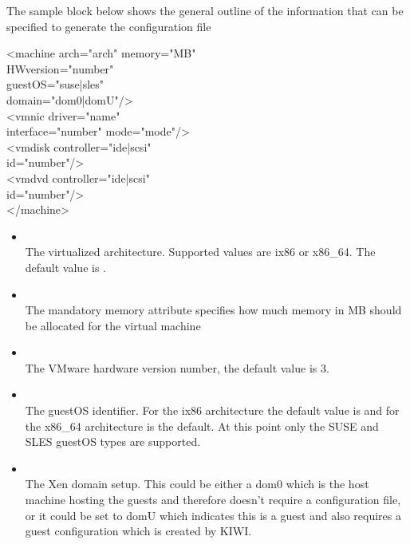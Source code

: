 \begin{itemize}
    The sample block below shows the general outline of the information
    that can be specified to generate the configuration file

	\begin{Command}{12cm}
	<machine arch="arch" memory="MB"\\
	\hspace*{2.5cm}HWversion="number"\\
	\hspace*{2.5cm}guestOS="suse|sles"\\
	\hspace*{2.5cm}domain="dom0|domU"/>\\
	\hspace*{1cm}<vmnic driver="name"\\
	\hspace*{2.5cm}interface="number" mode="mode"/>\\
	\hspace*{1cm}<vmdisk controller="ide|scsi"\\
	\hspace*{2.5cm}id="number"/>\\
	\hspace*{1cm}<vmdvd controller="ide|scsi"\\
	\hspace*{2.5cm}id="number"/>\\
	</machine>
	\end{Command}

	\begin{itemize}
	\item {}\\
      The virtualized architecture. Supported values are ix86 or x86\_64.
      The default value is .
	\item {}\\
      The mandatory memory attribute specifies how much memory in MB
      should be allocated for the virtual machine
	\item {}\\
      The VMware hardware version number, the default value is 3.
	\item {}\\
      The guestOS identifier. For the ix86 architecture the default 
      value is  and for the x86\_64 architecture
       is the default. At this point only the SUSE and
      SLES guestOS types are supported.
	\item {}\\
      The Xen domain setup. This could be either a dom0 which is the
      host machine hosting the guests and therefore doesn't require a
      configuration file, or it could be set to domU which indicates
      this is a guest and also requires a guest configuration which is
      created by KIWI.
	\end{itemize}


\end{itemize}
